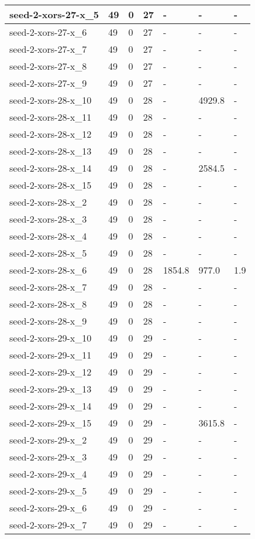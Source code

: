 \begin{scriptsize}
\begin{longtable}{|p{5cm}|l|l|l|l|l|l|}
seed-2-xors-27-x\_5&49&0&27&-&-&- \\ \hline 
seed-2-xors-27-x\_6&49&0&27&-&-&- \\ \hline 
seed-2-xors-27-x\_7&49&0&27&-&-&- \\ \hline 
seed-2-xors-27-x\_8&49&0&27&-&-&- \\ \hline 
seed-2-xors-27-x\_9&49&0&27&-&-&- \\ \hline 
seed-2-xors-28-x\_10&49&0&28&-&4929.8&- \\ \hline 
seed-2-xors-28-x\_11&49&0&28&-&-&- \\ \hline 
seed-2-xors-28-x\_12&49&0&28&-&-&- \\ \hline 
seed-2-xors-28-x\_13&49&0&28&-&-&- \\ \hline 
seed-2-xors-28-x\_14&49&0&28&-&2584.5&- \\ \hline 
seed-2-xors-28-x\_15&49&0&28&-&-&- \\ \hline 
seed-2-xors-28-x\_2&49&0&28&-&-&- \\ \hline 
seed-2-xors-28-x\_3&49&0&28&-&-&- \\ \hline 
seed-2-xors-28-x\_4&49&0&28&-&-&- \\ \hline 
seed-2-xors-28-x\_5&49&0&28&-&-&- \\ \hline 
seed-2-xors-28-x\_6&49&0&28&1854.8&977.0&1.9 \\ \hline 
seed-2-xors-28-x\_7&49&0&28&-&-&- \\ \hline 
seed-2-xors-28-x\_8&49&0&28&-&-&- \\ \hline 
seed-2-xors-28-x\_9&49&0&28&-&-&- \\ \hline 
seed-2-xors-29-x\_10&49&0&29&-&-&- \\ \hline 
seed-2-xors-29-x\_11&49&0&29&-&-&- \\ \hline 
seed-2-xors-29-x\_12&49&0&29&-&-&- \\ \hline 
seed-2-xors-29-x\_13&49&0&29&-&-&- \\ \hline 
seed-2-xors-29-x\_14&49&0&29&-&-&- \\ \hline 
seed-2-xors-29-x\_15&49&0&29&-&3615.8&- \\ \hline 
seed-2-xors-29-x\_2&49&0&29&-&-&- \\ \hline 
seed-2-xors-29-x\_3&49&0&29&-&-&- \\ \hline 
seed-2-xors-29-x\_4&49&0&29&-&-&- \\ \hline 
seed-2-xors-29-x\_5&49&0&29&-&-&- \\ \hline 
seed-2-xors-29-x\_6&49&0&29&-&-&- \\ \hline 
seed-2-xors-29-x\_7&49&0&29&-&-&- \\ \hline 

\end{longtable}
\end{scriptsize}
